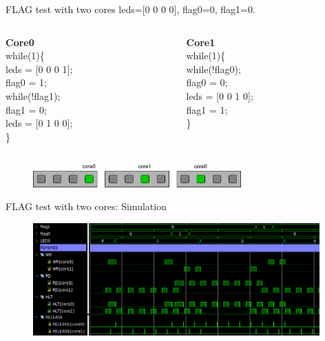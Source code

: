 \begin{frame}{FLAG test with two cores}
leds=[0 0 0 0], flag0=0, flag1=0.
  \begin{columns}[T]
    \begin{column}{0.4\textwidth}
        \textbf{Core0}\\
        while(1)\{\\
        \hspace{1cm}leds = [0 0 0 1];\\
        \hspace{1cm}flag0 = 1;\\
        \hspace{1cm}while(!flag1);\\
        \hspace{1cm}flag1 = 0;\\
        \hspace{1cm}leds = [0 1 0 0];\\
        \}
    \end{column}
    \begin{column}{0.4\textwidth}
        \textbf{Core1}\\
        while(1)\{\\
        \hspace{1cm}while(!flag0);\\
        \hspace{1cm}flag0 = 0;\\
        \hspace{1cm}leds = [0 0 1 0];\\
        \hspace{1cm}flag1 = 1;\\
        \}
    \end{column}
 \end{columns}
 \begin{figure}
    \centering
    \includegraphics[width=8cm]{images/leds2_fig.png}
    \label{fig:my_label}
\end{figure}
\end{frame}

\begin{frame}{FLAG test with two cores: Simulation}
\begin{figure}
    \centering
    \includegraphics[width=11cm]{images/flag2_sim_crop.png}
    \label{fig:my_label}
\end{figure}
\end{frame}

